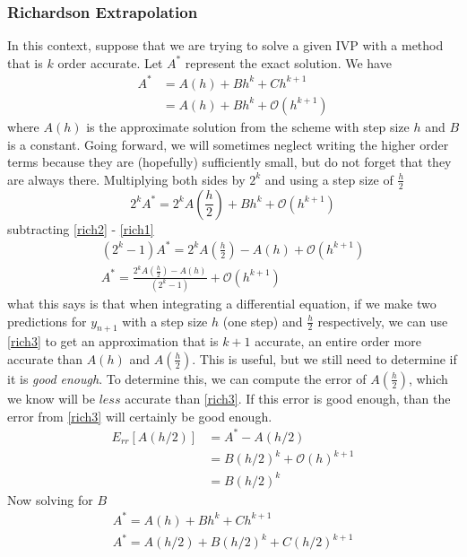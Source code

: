 \documentclass[]{article}
\theoremstyle{definition}
\numberwithin{equation}{section}
\begin{document}
	\subsubsection{Richardson Extrapolation}
	In this context, suppose that we are trying to solve a given IVP with a method that is $k$ order accurate. Let $A^*$ represent the exact solution. We have
	\begin{align}
		A^* &= A(h) + Bh^k + Ch^{k+1} \nonumber \\
		&= A(h) + Bh^k + \mathcal{O}(h^{k+1}) \label{rich1}
	\end{align}
	where $A(h)$ is the approximate solution from the scheme with step size $h$ and $B$ is a constant. Going forward, we will sometimes neglect writing the higher order terms because they are (hopefully) sufficiently small, but do not forget that they are always there. Multiplying both sides by $2^k$ and using a step size of $\frac{h}{2}$ 
	\begin{equation}
		2^k A^* = 2^k A\left(\frac{h}{2}\right) + B h^k \label{rich2} + \mathcal{O}(h^{k+1})
	\end{equation}
	subtracting \eqref{rich2} - \eqref{rich1}
	\begin{gather}
		(2^k -1)A^* = 2^k A\left(\frac{h}{2}\right) - A(h) + \mathcal{O}(h^{k+1}) \nonumber \\
		A^* = \frac{2^k A\left(\frac{h}{2}\right) - A(h)}{(2^k -1)} + \mathcal{O}(h^{k+1}) \label{rich3}
	\end{gather}
	what this says is that when integrating a differential equation, if we make two predictions  for $y_{n+1}$ with a step size $h$ (one step) and $\frac{h}{2}$ respectively, we can use \eqref{rich3} to get an approximation that is $k+1$ accurate, an entire order more accurate than $A(h)$ and $A(\frac{h}{2})$. This is useful, but we still need to determine if it is \textit{good enough}. To determine this, we can compute the error of $A(\frac{h}{2})$, which we know will be $\textit{less}$ accurate than \eqref{rich3}. If this error is good enough, than the error from \eqref{rich3} will certainly be good enough.
	\begin{align}
		E_{rr}[A(h/2)] &= A^* - A(h/2) \nonumber \\
		&= B(h/2)^{k} + \mathcal{O}(h)^{k+1}		 \nonumber \\
		&= B(h/2)^k  \label{rich4}
	\end{align}
	Now solving for $B$
	\begin{gather*}
		A^* = A(h) + Bh^k + Ch^{k+1} \\
		A^* = A(h/2) + B(h/2)^k + C(h/2)^{k+1}
	\end{gather*}
\end{document}
